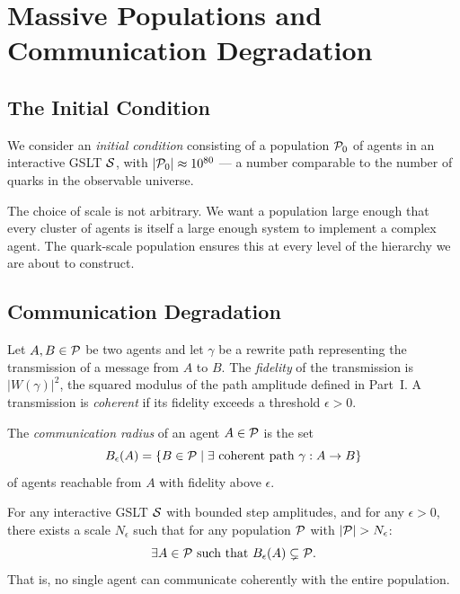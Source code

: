 \chapter{Massive Populations and Communication Degradation}
\label{sec:population}

\section{The Initial Condition}

We consider an \emph{initial condition} consisting of a population
$\mathcal{P}_0$ of agents in an interactive GSLT $\mathcal{S}$, with
$|\mathcal{P}_0| \approx 10^{80}$ --- a number comparable to the number of
quarks in the observable universe.

\begin{remark}
The choice of scale is not arbitrary.
We want a population large enough that every cluster of agents is
itself a large enough system to implement a complex agent.
The quark-scale population ensures this at every level of the
hierarchy we are about to construct.
\end{remark}

\section{Communication Degradation}

\begin{definition}
Let $A, B \in \mathcal{P}$ be two agents and let $\gamma$ be a rewrite
path representing the transmission of a message from $A$ to $B$.
The \emph{fidelity} of the transmission is $|W(\gamma)|^2$, the
squared modulus of the path amplitude defined in Part~I.
A transmission is \emph{coherent} if its fidelity exceeds a threshold
$\epsilon > 0$.
\end{definition}

\begin{definition}
The \emph{communication radius} of an agent $A \in \mathcal{P}$ is the set
\[
  B_\epsilon(A) = \{ B \in \mathcal{P} \mid
  \exists \text{ coherent path } \gamma : A \to B \}
\]
of agents reachable from $A$ with fidelity above $\epsilon$.
\end{definition}

\begin{conjecture}
\label{conj:degradation}
For any interactive GSLT $\mathcal{S}$ with bounded step amplitudes,
and for any $\epsilon > 0$, there exists a scale $N_\epsilon$ such
that for any population $\mathcal{P}$ with $|\mathcal{P}| > N_\epsilon$:
\[
  \exists A \in \mathcal{P} \text{ such that }
  B_\epsilon(A) \subsetneq \mathcal{P}.
\]
That is, no single agent can communicate coherently with the entire
population.
\end{conjecture}

